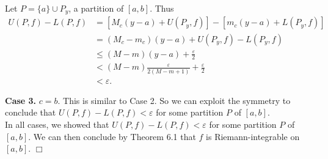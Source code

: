 \documentclass[9pt]{article}
\newcommand{\qed}{\hfill \ensuremath{\Box}}
\begin{document}
\begin{enumerate}
      Let $P = \{a\} \cup P_y$, a partition of $[a, b]$. Thus
      \begin{align*}
         U(P, f) - L(P, f) &= [M_c(y - a) + U(P_y, f)] -
            [m_c(y - a) + L(P_y, f)] \\
            &= (M_c - m_c)(y - a) + U(P_y, f) - L(P_y, f) \\
          &\le (M - m)(y - a) + \frac{\varepsilon}{2} \\
          &<(M - m)\frac{\varepsilon}{2(M-m+1)} + \frac{\varepsilon}{2} \\
          &< \varepsilon.
      \end{align*}
      
      \textbf{Case 3.} $c = b$. This is similar to Case 2. So we can exploit the
      symmetry to conclude that $U(P, f) - L(P, f) < \varepsilon$ for some
      partition $P$ of $[a, b]$. \\
      
      In all cases, we showed that $U(P, f) - L(P, f) < \varepsilon$ for some
      partition $P$ of $[a, b]$. We can then conclude by Theorem 6.1 that $f$ is
      Riemann-integrable on $[a, b]$. \qed
      
      
      
\end{enumerate}
\end{document}
